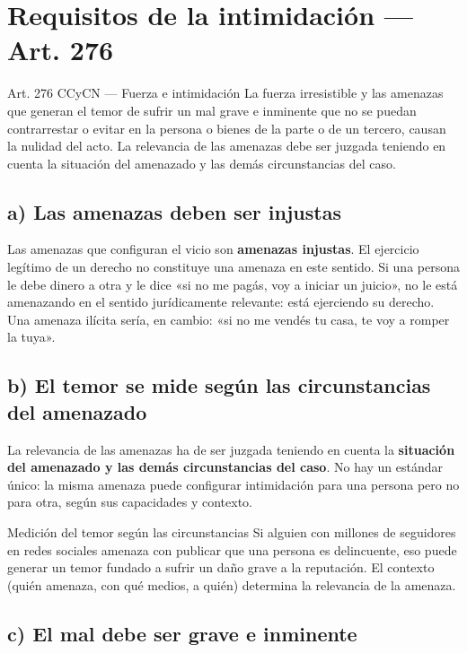 \documentclass[12pt,oneside]{book}
\begin{document}
\section{Requisitos de la intimidación --- Art. 276}

\begin{articulo}{Art. 276 CCyCN --- Fuerza e intimidación}
La fuerza irresistible y las amenazas que generan el temor de sufrir un mal grave e inminente que no se puedan contrarrestar o evitar en la persona o bienes de la parte o de un tercero, causan la nulidad del acto. La relevancia de las amenazas debe ser juzgada teniendo en cuenta la situación del amenazado y las demás circunstancias del caso.
\end{articulo}

\subsection*{a) Las amenazas deben ser injustas}

Las amenazas que configuran el vicio son \textbf{amenazas injustas}. El ejercicio legítimo de un derecho no constituye una amenaza en este sentido. Si una persona le debe dinero a otra y le dice «si no me pagás, voy a iniciar un juicio», no le está amenazando en el sentido jurídicamente relevante: está ejerciendo su derecho. Una amenaza ilícita sería, en cambio: «si no me vendés tu casa, te voy a romper la tuya».

\subsection*{b) El temor se mide según las circunstancias del amenazado}

La relevancia de las amenazas ha de ser juzgada teniendo en cuenta la \textbf{situación del amenazado y las demás circunstancias del caso}. No hay un estándar único: la misma amenaza puede configurar intimidación para una persona pero no para otra, según sus capacidades y contexto.

\begin{example}{Medición del temor según las circunstancias}
Si alguien con millones de seguidores en redes sociales amenaza con publicar que una persona es delincuente, eso puede generar un temor fundado a sufrir un daño grave a la reputación. El contexto (quién amenaza, con qué medios, a quién) determina la relevancia de la amenaza.
\end{example}

\subsection*{c) El mal debe ser grave e inminente}
\end{document}
